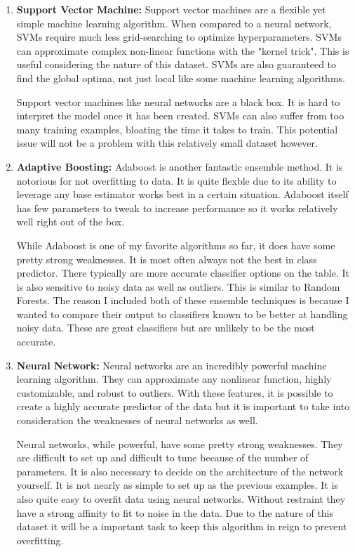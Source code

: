 \documentclass[11pt]{article}
\begin{document}
	\begin{enumerate}
		
		\item \textbf{Support Vector Machine:} Support vector machines are a flexible yet simple machine learning algorithm. When compared to a neural network, SVMs require much less grid-searching to optimize hyperparameters. SVMs can approximate complex non-linear functions with the "kernel trick". This is useful considering the nature of this dataset. SVMs are also guaranteed to find the global optima, not just local like some machine learning algorithms.
		
		Support vector machines like neural networks are a black box. It is hard to interpret the model once it has been created. SVMs can also suffer from too many training examples, bloating the time it takes to train. This potential issue will not be a problem with this relatively small dataset however.
		
		\item \textbf{Adaptive Boosting:} Adaboost is another fantastic ensemble method. It is notorious for not overfitting to data. It is quite flexble due to its ability to leverage any base estimator works best in a certain situation. Adaboost itself has few parameters to tweak to increase performance so it works relatively well right out of the box.
		
		While Adaboost is one of my favorite algorithms so far, it does have some pretty strong weaknesses. It is most often always not the best in class predictor. There typically are more accurate classifier options on the table. It is also sensitive to noisy data as well as outliers. This is similar to Random Forests. The reason I included both of these ensemble techniques is because I wanted to compare their output to classifiers known to be better at handling noisy data. These are great classifiers but are unlikely to be the most accurate.
		
		\item \textbf{Neural Network:} Neural networks are an incredibly powerful machine learning algorithm. They can approximate any nonlinear function, highly customizable, and robust to outliers. With these features, it is possible to create a highly accurate predictor of the data but it is important to take into consideration the weaknesses of neural networks as well.
		
		Neural networks, while powerful, have some pretty strong weaknesses. They are difficult to set up and difficult to tune because of the number of parameters. It is also necessary to decide on the architecture of the network yourself. It is not nearly as simple to set up as the previous examples. It is also quite easy to overfit data using neural networks. Without restraint they have a strong affinity to fit to noise in the data. Due to the nature of this dataset it will be a important task to keep this algorithm in reign to prevent overfitting.
		

\end{enumerate}
\end{document}

